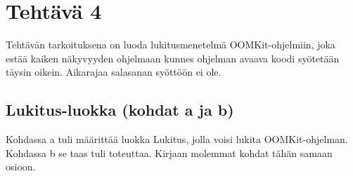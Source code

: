
\chapter{Tehtävä 4 \label{chap:Teht=0000E4v=0000E4-4}}

Tehtävän tarkoituksena on luoda lukitusmenetelmä OOMKit-ohjelmiin, joka estää kaiken näkyvyyden ohjelmaan kunnes ohjelman avaava koodi syötetään täysin oikein. Aikarajaa salasanan syöttöön ei ole.

\section{Lukitus-luokka (kohdat a ja b)}

\label{Lukitus-luokka}

Kohdassa a tuli määrittää luokka Lukitus, jolla voisi lukita OOMKit-ohjelman. Kohdassa b se taas tuli toteuttaa. Kirjaan molemmat kohdat tähän samaan osioon.

